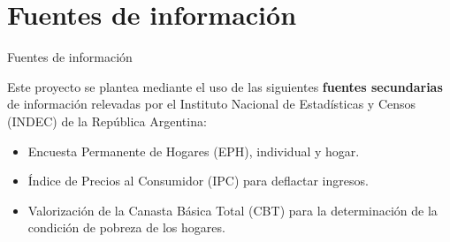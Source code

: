 \documentclass[10pt]{beamer}
\begin{document}
\section{Fuentes de información}

\begin{frame}{Fuentes de información}

Este proyecto se plantea mediante el uso de las siguientes \textbf{fuentes secundarias} de información relevadas por el Instituto Nacional de Estadísticas y Censos (INDEC) de la República Argentina:

\begin{itemize}
    \item Encuesta Permanente de Hogares (EPH), individual y hogar.
    \item Índice de Precios al Consumidor (IPC) para deflactar ingresos.
    \item Valorización de la Canasta Básica Total (CBT) para la determinación de la condición de pobreza de los hogares.
\end{itemize}

\end{frame}
\end{document}
